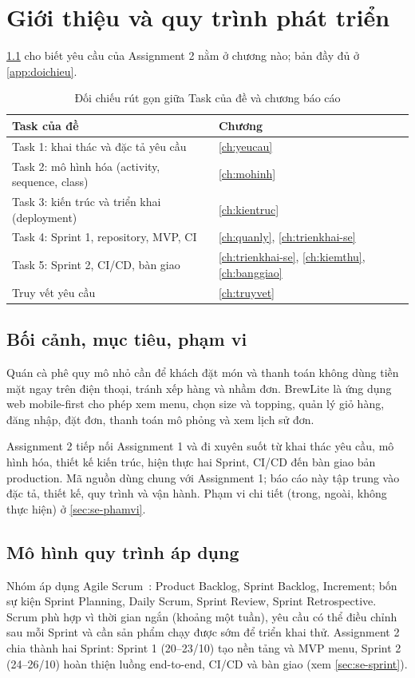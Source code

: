\chapter{Giới thiệu và quy trình phát triển}\label{ch:gioithieu}
\cref{tab:doichieu-rutgon} cho biết yêu cầu của Assignment 2 nằm ở chương nào; bản đầy đủ ở \cref{app:doichieu}.
\begin{table}[htbp]\centering
\caption{Đối chiếu rút gọn giữa Task của đề và chương báo cáo}\label{tab:doichieu-rutgon}
\begin{tabular}{@{}p{6.4cm}p{6.6cm}@{}}\toprule
\textbf{Task của đề} & \textbf{Chương} \\ \midrule
Task 1: khai thác và đặc tả yêu cầu & \cref{ch:yeucau} \\
Task 2: mô hình hóa (activity, sequence, class) & \cref{ch:mohinh} \\
Task 3: kiến trúc và triển khai (deployment) & \cref{ch:kientruc} \\
Task 4: Sprint 1, repository, MVP, CI & \cref{ch:quanly}, \cref{ch:trienkhai-se} \\
Task 5: Sprint 2, CI/CD, bàn giao & \cref{ch:trienkhai-se}, \cref{ch:kiemthu}, \cref{ch:banggiao} \\
Truy vết yêu cầu & \cref{ch:truyvet} \\ \bottomrule
\end{tabular}
\end{table}

\section{Bối cảnh, mục tiêu, phạm vi}\label{sec:se-boicanh}
Quán cà phê quy mô nhỏ cần để khách đặt món và thanh toán không dùng tiền mặt ngay trên điện thoại, tránh xếp hàng và nhầm đơn. BrewLite là ứng dụng web mobile-first cho phép xem menu, chọn size và topping, quản lý giỏ hàng, đăng nhập, đặt đơn, thanh toán mô phỏng và xem lịch sử đơn.

Assignment 2 tiếp nối Assignment 1 và đi xuyên suốt từ khai thác yêu cầu, mô hình hóa, thiết kế kiến trúc, hiện thực hai Sprint, CI/CD đến bàn giao bản production. Mã nguồn dùng chung với Assignment 1; báo cáo này tập trung vào đặc tả, thiết kế, quy trình và vận hành. Phạm vi chi tiết (trong, ngoài, không thực hiện) ở \cref{sec:se-phamvi}.

\section{Mô hình quy trình áp dụng}\label{sec:se-quytrinh}
Nhóm áp dụng Agile Scrum~\cite{scrumguide2020}: Product Backlog, Sprint Backlog, Increment; bốn sự kiện Sprint Planning, Daily Scrum, Sprint Review, Sprint Retrospective. Scrum phù hợp vì thời gian ngắn (khoảng một tuần), yêu cầu có thể điều chỉnh sau mỗi Sprint và cần sản phẩm chạy được sớm để triển khai thử. Assignment 2 chia thành hai Sprint: Sprint 1 (20--23/10) tạo nền tảng và MVP menu, Sprint 2 (24--26/10) hoàn thiện luồng end-to-end, CI/CD và bàn giao (xem \cref{sec:se-sprint}).

